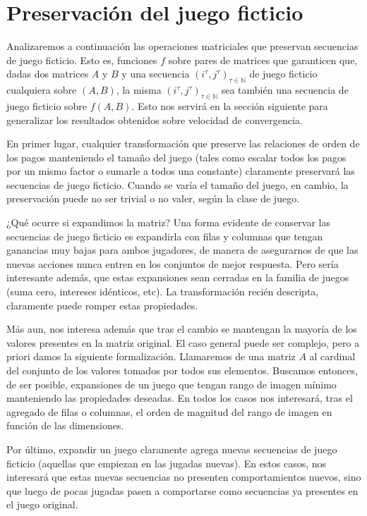 \section{Preservación del juego ficticio} \label{sec:aportes:preservacion}

Analizaremos a continuación las operaciones matriciales que preservan secuencias de juego ficticio. Esto es, funciones $f$ sobre pares de matrices que garanticen que, dadas dos matrices $A$ y $B$ y una secuencia $(i^\tau, j^\tau)_{\tau \in \mathbb{N}}$ de juego ficticio cualquiera sobre $(A, B)$, la misma $(i^\tau, j^\tau)_{\tau \in \mathbb{N}}$ sea también una secuencia de juego ficticio sobre $f(A, B)$. Esto nos servirá en la sección siguiente para generalizar los resultados obtenidos sobre velocidad de convergencia.

En primer lugar, cualquier transformación que preserve las relaciones de orden de los pagos manteniendo el tamaño del juego (tales como escalar todos los pagos por un mismo factor o sumarle a todos una constante) claramente preservará las secuencias de juego ficticio. Cuando se varía el tamaño del juego, en cambio, la preservación puede no ser trivial o no valer, según la clase de juego.

¿Qué ocurre si expandimos la matriz? Una forma evidente de conservar las secuencias de juego ficticio es expandirla con filas y columnas que tengan ganancias muy bajas para ambos jugadores, de manera de asegurarnos de que las nuevas acciones nunca entren en los conjuntos de mejor respuesta. Pero sería interesante además, que estas expansiones sean cerradas en la familia de juegos (suma cero, intereses idénticos, etc). La transformación recién descripta, claramente puede romper estas propiedades.

Más aun, nos interesa además que tras el cambio se mantengan la mayoría de los valores presentes en la matriz original. El caso general puede ser complejo, pero a priori damos la siguiente formalización. Llamaremos  de una matriz $A$ al cardinal del conjunto de los valores tomados por todos sus elementos. Buscamos entonces, de ser posible, expansiones de un juego que tengan rango de imagen mínimo manteniendo las propiedades deseadas. En todos los casos nos interesará, tras el agregado de filas o columnas, el orden de magnitud del rango de imagen en función de las dimensiones.

Por último, expandir un juego claramente agrega nuevas secuencias de juego ficticio (aquellas que empiezan en las jugadas nuevas). En estos casos, nos interesará que estas nuevas secuencias no presenten comportamientos nuevos, sino que luego de pocas jugadas pasen a comportarse como secuencias ya presentes en el juego original.

